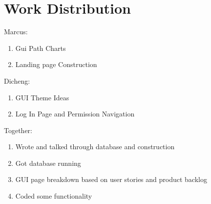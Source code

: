 \documentclass[11pt]{book}
\begin{document}
\section{Work Distribution}

Marcus:
\begin{enumerate}
\item Gui Path Charts
\item Landing page Construction\\
\end{enumerate}

Dicheng:
\begin{enumerate}
\item GUI Theme Ideas
\item Log In Page and Permission Navigation\\
\end{enumerate}


Together:
\begin{enumerate}
\item Wrote and talked through database and construction
\item Got database running
\item GUI page breakdown based on user stories and product backlog
\item Coded some functionality
\end{enumerate}
\end{document}
